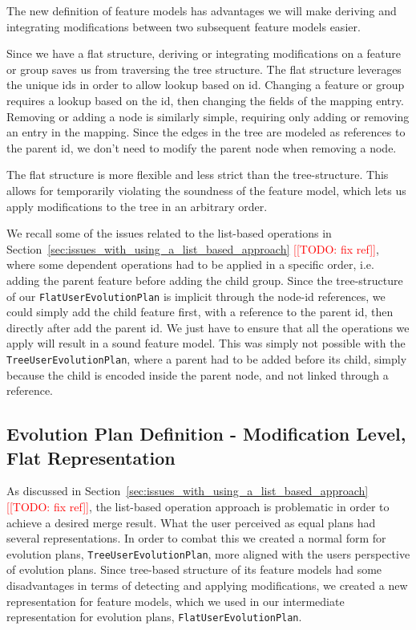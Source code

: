 \documentclass[a4paper,english]{ifimaster}
\newcommand{\todo}[1]{\textcolor{red}{[[TODO: #1]]}\PackageWarning{TODO:}{#1!}}
\begin{document}
The new definition of feature models has advantages we will make deriving and integrating modifications between two subsequent feature models easier. 

Since we have a flat structure, deriving or integrating modifications on a feature or group saves us from traversing the tree structure. The flat structure leverages the unique ids in order to allow lookup based on id. Changing a feature or group requires a lookup based on the id, then changing the fields of the mapping entry. Removing or adding a node is similarly simple, requiring only adding or removing an entry in the mapping. Since the edges in the tree are modeled as references to the parent id, we don't need to modify the parent node when removing a node.

The flat structure is more flexible and less strict than the tree-structure. This allows for temporarily violating the soundness of the feature model, which lets us apply modifications to the tree in an arbitrary order.

We recall some of the issues related to the list-based operations in Section~\ref{sec:issues_with_using_a_list_based_approach} \todo{fix ref}, where some dependent operations had to be applied in a specific order, i.e. adding the parent feature before adding the child group. Since the tree-structure of our \texttt{FlatUserEvolutionPlan} is implicit through the node-id references, we could simply add the child feature first, with a reference to the parent id, then directly after add the parent id. We just have to ensure that all the operations we apply will result in a sound feature model. This was simply not possible with the \texttt{TreeUserEvolutionPlan}, where a parent had to be added before its child, simply because the child is encoded inside the parent node, and not linked through a reference.

\subsection{Evolution Plan Definition - Modification Level, Flat Representation}%
\label{sub:evolution_plan_definition_modification_level_flat_representation}

As discussed in Section~\ref{sec:issues_with_using_a_list_based_approach} \todo{fix ref}, the list-based operation approach is problematic in order to achieve a desired merge result. What the user perceived as equal plans had several representations. In order to combat this we created a normal form for evolution plans, \texttt{TreeUserEvolutionPlan}, more aligned with the users perspective of evolution plans. Since tree-based structure of its feature models had some disadvantages in terms of detecting and applying modifications, we created a new representation for feature models, which we used in our intermediate representation for evolution plans, \texttt{FlatUserEvolutionPlan}.
\end{document}
